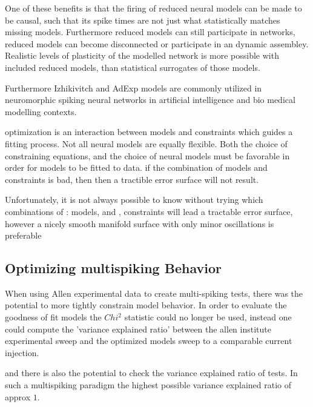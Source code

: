 
One of these benefits is that the firing of reduced neural models can be made to be causal, such that its spike times are not just what statistically matches missing models. Furthermore reduced models can still participate in networks, reduced models can become disconnected or participate in an dynamic assembley. Realistic levels of plasticity of the modelled network is more possible with included reduced models, than statistical surrogates of those models.

Furthermore Izhikivitch and AdExp models are commonly utilized in neuromorphic spiking neural networks in artificial intelligence and bio medical modelling contexts.

optimization is an interaction between models and constraints which guides a fitting process. Not all neural models are equally flexible.  
Both the choice of constraining equations, and the choice of neural models must be favorable in order for models to be fitted to data.
if the combination of models and constraints is bad, then then a tractible error surface will not result.  

Unfortunately, it is not always possible to know without trying which combinations of \subitem[A]: models, and \subitem[B], constraints will lead a tractable error surface, however a nicely smooth manifold surface with only minor oscillations is preferable


\subsection{Optimizing multispiking Behavior}

When using Allen experimental data to create multi-spiking tests, there was the potential to more tightly constrain model behavior. In order to evaluate the goodness of fit models the $Chi^{2}$ statistic could no longer be used, instead one could compute the 'variance explained ratio' between the allen institute experimental sweep and the optimized models sweep to a comparable current injection.

and there is also the potential to check the variance explained ratio of tests.
In such a multispiking paradigm the highest possible variance explained ratio of approx $1$. 

